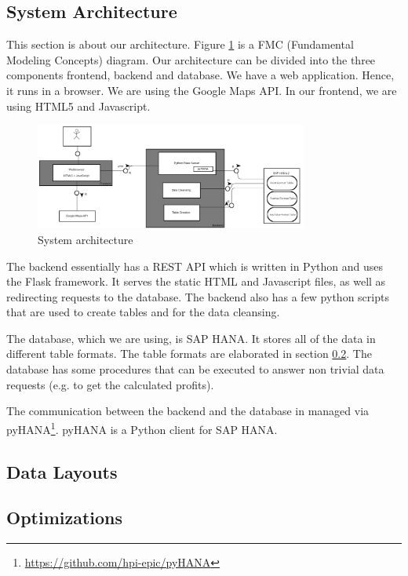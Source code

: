 \documentclass[10pt]{sig-alternate}
\begin{document}
\subsection{System Architecture}

This section is about our architecture. Figure \ref{fig:architecture} is a FMC (Fundamental Modeling Concepts) diagram. Our architecture can be divided into the three components frontend, backend and database. We have a web application. Hence, it runs in a browser. We are using the Google Maps API. In our frontend, we are using HTML5 and Javascript.\\

\begin{figure}
\centering
\includegraphics[width=0.8\textwidth]{img/architecture.png}
\caption{System architecture}
\label{fig:architecture}
\end{figure}

The backend essentially has a REST API which is written in Python and uses the Flask framework. It serves the static HTML and Javascript files, as well as redirecting requests to the database. The backend also has a few python scripts that are used to create tables and for the data cleansing.

The database, which we are using, is SAP HANA. It stores all of the data in different table formats. The table formats are elaborated in section \ref{sec:data_layouts}. The database has some procedures that can be executed to answer non trivial data requests (e.g. to get the calculated profits). 

The communication between the backend and the database in managed via pyHANA\footnote{\href{https://github.com/hpi-epic/pyHANA}{https://github.com/hpi-epic/pyHANA}}. pyHANA is a Python client for SAP HANA.


\subsection{Data Layouts}
\label{sec:data_layouts}

\subsection{Optimizations}
\end{document}
